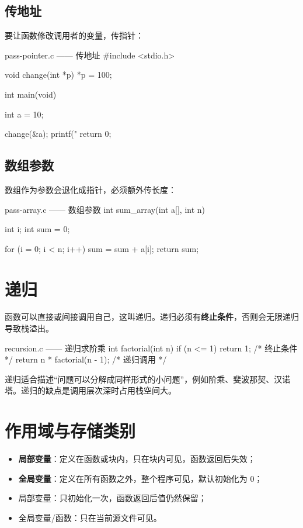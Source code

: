 \subsection{传地址}

要让函数修改调用者的变量，传指针：

\begin{codebox}{pass-pointer.c —— 传地址}
#include <stdio.h>

void change(int *p)
{
    *p = 100;
}

int main(void)
{
    int a = 10;

    change(&a);
    printf("%
    return 0;
}
\end{codebox}

\subsection{数组参数}

数组作为参数会退化成指针，必须额外传长度：

\begin{codebox}{pass-array.c —— 数组参数}
int sum_array(int a[], int n)
{
    int i;
    int sum = 0;

    for (i = 0; i < n; i++) {
        sum = sum + a[i];
    }
    return sum;
}
\end{codebox}

\section{递归}

函数可以直接或间接调用自己，这叫递归。递归必须有\textbf{终止条件}，否则会无限递归导致栈溢出。

\begin{codebox}{recursion.c —— 递归求阶乘}
int factorial(int n)
{
    if (n <= 1) {
        return 1;               /* 终止条件 */
    }
    return n * factorial(n - 1); /* 递归调用 */
}
\end{codebox}

递归适合描述“问题可以分解成同样形式的小问题”，例如阶乘、斐波那契、汉诺塔。递归的缺点是调用层次深时占用栈空间大。

\section{作用域与存储类别}

\begin{itemize}
  \item \textbf{局部变量}：定义在函数或块内，只在块内可见，函数返回后失效；
  \item \textbf{全局变量}：定义在所有函数之外，整个程序可见，默认初始化为 0；
  \item {} 局部变量：只初始化一次，函数返回后值仍然保留；
  \item {} 全局变量/函数：只在当前源文件可见。
\end{itemize}

